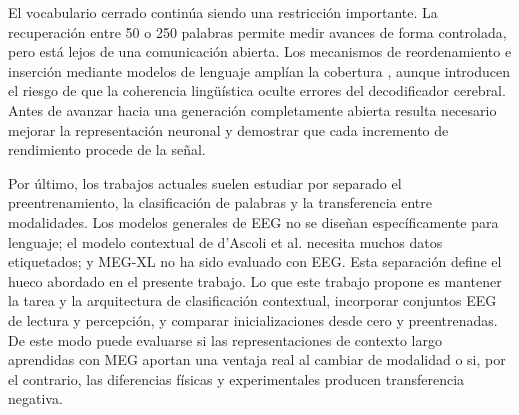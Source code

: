 El vocabulario cerrado continúa siendo una restricción importante. La recuperación entre 50 o 250 palabras permite medir avances de forma controlada, pero está lejos de una comunicación abierta. Los mecanismos de reordenamiento e inserción mediante modelos de lenguaje amplían la cobertura \cite{jayalath2025unlocking}, aunque introducen el riesgo de que la coherencia lingüística oculte errores del decodificador cerebral. Antes de avanzar hacia una generación completamente abierta resulta necesario mejorar la representación neuronal y demostrar que cada incremento de rendimiento procede de la señal.

Por último, los trabajos actuales suelen estudiar por separado el preentrenamiento, la clasificación de palabras y la transferencia entre modalidades. Los modelos generales de EEG no se diseñan específicamente para lenguaje; el modelo contextual de d'Ascoli et al. necesita muchos datos etiquetados; y MEG-XL no ha sido evaluado con EEG. Esta separación define el hueco abordado en el presente trabajo. Lo que este trabajo propone es mantener la tarea y la arquitectura de clasificación contextual, incorporar conjuntos EEG de lectura y percepción, y comparar inicializaciones desde cero y preentrenadas. De este modo puede evaluarse si las representaciones de contexto largo aprendidas con MEG aportan una ventaja real al cambiar de modalidad o si, por el contrario, las diferencias físicas y experimentales producen transferencia negativa.
